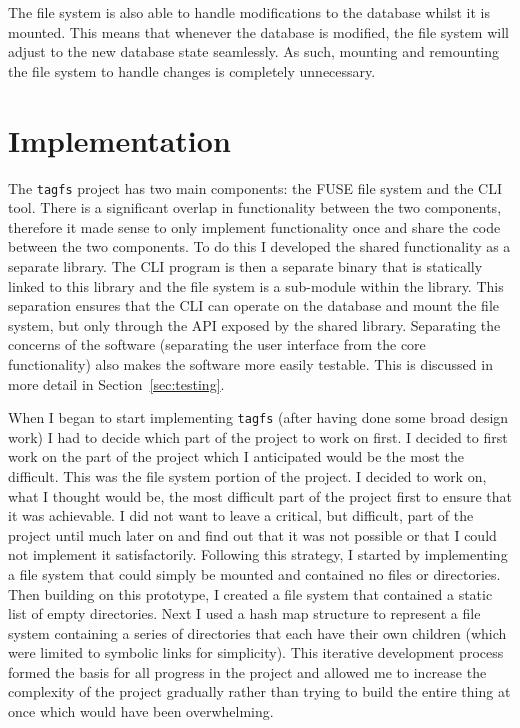 The file system is also able to handle modifications to the database whilst it
is mounted. This means that whenever the database is modified, the file system
will adjust to the new database state seamlessly. As such, mounting and
remounting the file system to handle changes is completely unnecessary.

\section{Implementation}

The \texttt{tagfs} project has two main components: the FUSE file system and
the CLI tool. There is a significant overlap in functionality between the two
components, therefore it made sense to only implement functionality once and
share the code between the two components. To do this I developed the shared
functionality as a separate library.
The CLI program is then a separate binary that is statically linked to this
library and the file system is a sub-module within the library. This separation
ensures that the CLI can operate on the database and mount the file system, but
only through the API exposed by the shared library. Separating the concerns of
the software (separating the user interface from the core functionality) also
makes the software more easily testable. This is discussed in more detail in
Section~\ref{sec:testing}.

When I began to start implementing \texttt{tagfs} (after having done some broad
design work) I had to decide which part of the project to work on first. I
decided to first work on the part of the project which I anticipated would be
the most the difficult. This was the file system portion of the project. I
decided to work on, what I thought would be, the most difficult part of the
project first to ensure that it was achievable. I did not want to leave a
critical, but difficult, part of the project until much later on and find out
that it was not possible or that I could not implement it satisfactorily.
Following this strategy, I started by implementing a file system that could
simply be mounted and contained no files or directories. Then building on this
prototype, I created a file system that contained a static list of empty
directories. Next I used a hash map structure to represent a file system
containing a series of directories that each have their own children (which
were limited to symbolic links for simplicity). This iterative development
process formed the basis for all progress in the project and allowed me to
increase the complexity of the project gradually rather than trying to build
the entire thing at once which would have been overwhelming.


